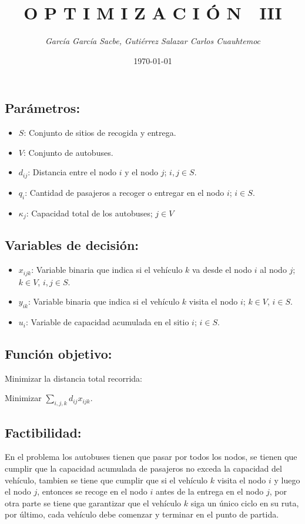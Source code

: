 \documentclass[11pt]{article}
\title{O P T I M I Z A C I Ó N\, \, \textbf{\color{wsdred}III}}
\author{\textit{García García Sacbe, Gutiérrez Salazar Carlos Cuauhtemoc}}
\date{\today}
\begin{document}
\maketitle


\subsection*{Parámetros:}
\begin{itemize}
	\item $S$: Conjunto de sitios de recogida y entrega.
	\item $V$: Conjunto de autobuses.
	\item $d_{ij}$: Distancia entre el nodo $i$ y el nodo $j$; $i,j\in S$.
	\item $q_i$: Cantidad de pasajeros a recoger o entregar en el nodo $i$; $i\in S$.
	\item $\kappa_j$: Capacidad total de los autobuses; $j \in V$ 
\end{itemize}

\subsection*{Variables de decisión:}
\begin{itemize}
	\item $x_{ijk}$: Variable binaria que indica si el vehículo $k$ va desde el nodo $i$ al nodo $j$; $k\in V$, $i,j\in S$.
	\item $y_{ik}$: Variable binaria que indica si el vehículo $k$ visita el nodo $i$; $k\in V$, $i\in S$.
	\item $u_i$: Variable de capacidad acumulada en el sitio $i$; $i\in S$.
\end{itemize}

\subsection*{Función objetivo:}
Minimizar la distancia total recorrida:

Minimizar $\sum_{i,j,k} d_{ij} x_{ijk}$.

\subsection*{Factibilidad:} En el problema los autobuses tienen que pasar por todos los nodos, se tienen que cumplir que la capacidad acumulada de pasajeros no exceda la capacidad del vehículo, tambien se tiene que cumplir que si el vehículo $k$ visita el nodo $i$ y luego el nodo $j$, entonces se recoge en el nodo $i$ antes de la entrega en el nodo $j$, por otra parte se tiene que garantizar que el vehículo $k$ siga un único ciclo en su ruta, por último, 	cada vehículo debe comenzar y terminar en el punto de partida.
\end{document}
